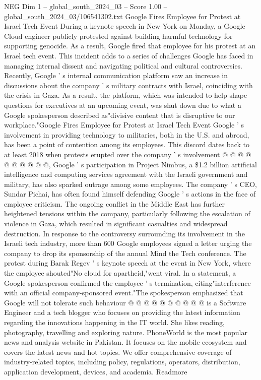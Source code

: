 \begin{textsample}{NEG Dim 1 – global\_south\_2024\_03 – Score 1.00 – global\_south\_2024\_03/106541302.txt}  \label{ex:f1_neg_435}
Google Fires Employee for Protest at Israel Tech Event During a keynote speech in New York on Monday, a Google Cloud engineer publicly protested against building harmful technology for supporting genocide.
As a result, Google fired that employee for his protest at an Israel tech event.
This incident adds to a series of challenges Google has faced in managing internal dissent and navigating political and cultural controversies.
Recently, Google ' s internal communication platform saw an increase in discussions about the company ' s military contracts with Israel, coinciding with the crisis in Gaza.
As a result, the platform, which was intended to help shape questions for executives at an upcoming event, was shut down due to what a Google spokesperson described as"divisive content that is disruptive to our workplace."Google Fires Employee for Protest at Israel Tech Event Google ' s involvement in providing technology to militaries, both in the U.S. and abroad, has been a point of contention among its employees.
This discord dates back to at least 2018 when protests erupted over the company ' s involvement @ @ @ @ @ @ @ @ @ @, Google ' s participation in Project Nimbus, a \$1.2 billion artificial intelligence and computing services agreement with the Israeli government and military, has also sparked outrage among some employees.
The company ' s CEO, Sundar Pichai, has often found himself defending Google ' s actions in the face of employee criticism.
The ongoing conflict in the Middle East has further heightened tensions within the company, particularly following the escalation of violence in Gaza, which resulted in significant casualties and widespread destruction.
In response to the controversy surrounding its involvement in the Israeli tech industry, more than 600 Google employees signed a letter urging the company to drop its sponsorship of the annual Mind the Tech conference.
The protest during Barak Regev ' s keynote speech at the event in New York, where the employee shouted"No cloud for apartheid,"went viral.
In a statement, a Google spokesperson confirmed the employee ' s termination, citing"interference with an official company-sponsored event."The spokesperson emphasized that Google will not tolerate such behaviour @ @ @ @ @ @ @ @ @ @ is a Software Engineer and a tech blogger who focuses on providing the latest information regarding the innovations happening in the IT world.
She likes reading, photography, travelling and exploring nature.
PhoneWorld is the most popular news and analysis website in Pakistan.
It focuses on the mobile ecosystem and covers the latest news and hot topics.
We offer comprehensive coverage of industry-related topics, including policy, regulations, operators, distribution, application development, devices, and academia.
Readmore

\end{textsample}

